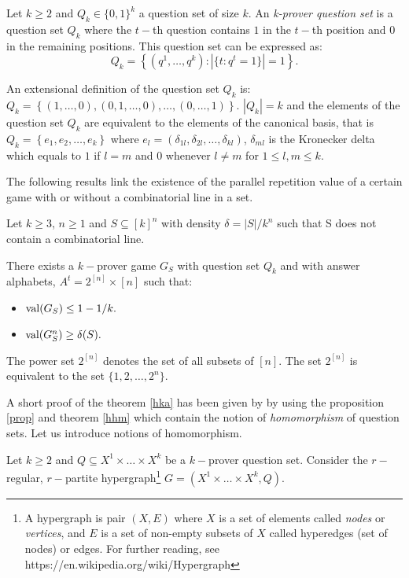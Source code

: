 \begin{defn}Let $k\geq 2$ and $Q_k \in \{0,1\}^k$ a question set of size $k.$ An \textit{k-prover question set} is a question set $Q_k$ where the $t-$th question contains $1$ in the $t-$th position and $0$ in the remaining positions. This question set can be expressed as:
$$Q_k=\left\lbrace(q^1, \ldots, q^k): |\{t:q^t=1\}|=1\right\rbrace.$$		\end{defn}
 
 An extensional definition of the question set $Q_k$ is: $Q_k=\left\lbrace (1,\ldots,0), (0,1,\ldots,0), \ldots, (0,\ldots,1) \right\rbrace.$ $|Q_k|=k$ and the elements of the question set $Q_k$ are equivalent to the elements of the canonical basis, that is $Q_k= \left\lbrace e_1, e_2, \ldots, e_k\right\rbrace$ where $e_l=(\delta_{1l}, \delta_{2l}, \ldots, \delta_{kl} )$, $\delta_{ml}$ is the Kronecker delta which equals to $1$ if $l=m$ and $0$ whenever $l \neq m$ for $1 \leq l, m \leq  k.$ 
 
The following results link the existence of the parallel repetition value of a certain game with or without a  combinatorial line in a set.
 
 \begin{thm} Let $k\geq 3$, $n\geq 1$ and $S\subseteq [k]^n$ with density $\delta=|S|/k^n$ such that S does not contain a combinatorial line.	
 
There exists a $k-$prover game $G_S$ with question set $Q_k$ and with answer alphabets,
$A^t = 2^{[n]} \times [n]$ such that:
\begin{itemize}
\item $\mathrm{val} (G_S) \leq 1-1/k.$ 	\item $\mathrm{val} (G_S^n) \geq \delta(S).$
\end{itemize} \label{hka}
 	\end{thm}
 
The power set  $2^{[n]}$ denotes the set of all subsets of $[n]$. The set $2^{[n]}$ is equivalent to the set $\{1,2,\ldots, 2^n\}.$

A short proof of the theorem \eqref{hka} has been given by \cite{hkazla2016forbidden} by using the proposition \eqref{prop} and theorem \eqref{hhm} which contain  the notion of \textit{homomorphism} of question sets. Let us introduce notions of homomorphism.

Let $k\geq 2$ and $Q \subseteq X^1 \times \ldots \times X^k$ be a $k-$prover question set. Consider the $r-$regular, $r-$partite hypergraph\footnote{A hypergraph is pair $(X,E)$ where $X$ is a set of elements called \textit{nodes} or \textit{vertices}, and $E$ is a set of non-empty subsets of $X$ called hyperedges (set of nodes) or edges. For further reading, see https://en.wikipedia.org/wiki/Hypergraph} $G=(X^1 \times \ldots \times X^k, Q).$

